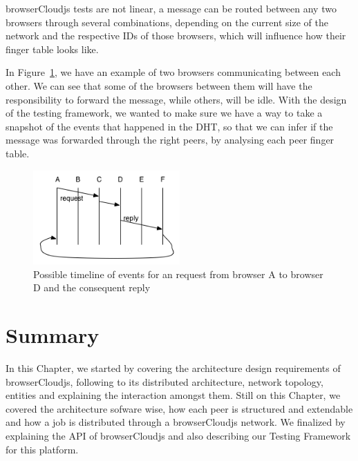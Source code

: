 browserCloudjs tests are not linear, a message can be routed between any two browsers through several combinations, depending on the current size of the network and the respective IDs of those browsers, which will influence how their finger table looks like.

In Figure~\ref{fig:t-f-2}, we have an example of two browsers communicating between each other. We can see that some of the browsers between them will have the responsibility to forward the message, while others, will be idle. With the design of the testing framework, we wanted to make sure we have a way to take a snapshot of the events that happened in the DHT, so that we can infer if the message was forwarded through the right peers, by analysing each peer finger table.

\begin{figure}[h!]
  \centering
  \includegraphics[width=0.5\textwidth]{figs/testing-framework-2}
  \caption{Possible timeline of events for an request from browser A to browser D and the consequent reply}
  \label{fig:t-f-2}
\end{figure}

\section{Summary}

In this Chapter, we started by covering the architecture design requirements of browserCloudjs, following to its distributed architecture, network topology, entities and explaining the interaction amongst them. Still on this Chapter, we covered the architecture sofware wise, how each peer is structured and extendable and how a job is distributed through a browserCloudjs network. We finalized by explaining the API of browserCloudjs and also describing our Testing Framework for this platform.
